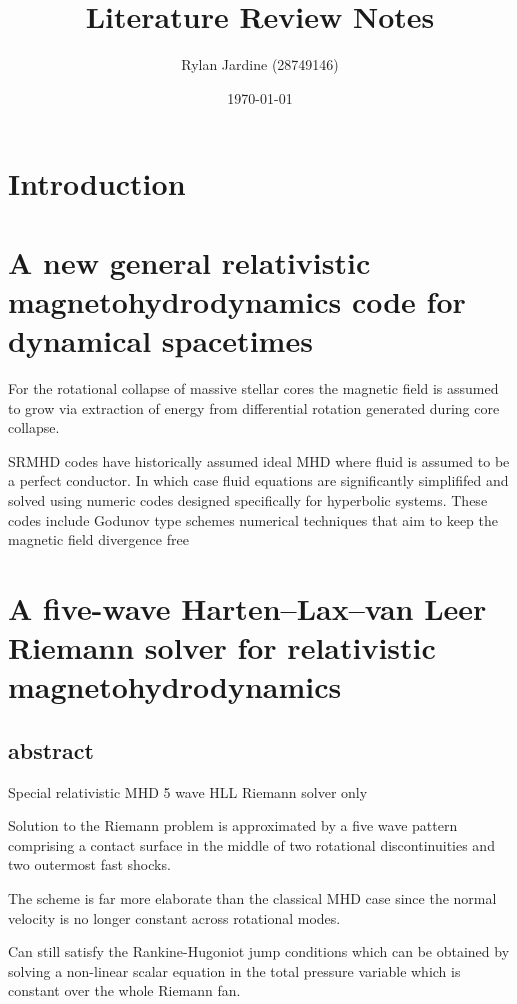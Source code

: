 \documentclass{article}
\title{\textbf{Literature Review Notes}}
\author{Rylan Jardine (28749146)}
\date{\today}
\begin{document}
\maketitle
\section{Introduction}



\section{A new general relativistic magnetohydrodynamics code for dynamical spacetimes}

\cite{newmhd}

For the rotational collapse of massive stellar cores the magnetic field is assumed to grow via extraction of energy from differential rotation generated during core collapse. 

SRMHD codes have historically assumed ideal MHD where fluid is assumed to be a perfect conductor. In which case fluid equations are significantly simplififed and solved using numeric codes designed specifically for hyperbolic systems. These codes include Godunov type schemes numerical techniques that aim to keep the magnetic field divergence free 

\section{A five-wave Harten--Lax--van Leer Riemann solver for relativistic magnetohydrodynamics}

 \cite{5waverel}
 
 \subsection{abstract}

Special relativistic MHD 5 wave HLL Riemann solver only

Solution to the Riemann problem is approximated by a five wave pattern comprising a contact surface in the middle of two rotational discontinuities and two outermost fast shocks. 

The scheme is far more elaborate than the classical MHD case since the normal velocity is no longer constant across rotational modes. 

Can still satisfy the Rankine-Hugoniot jump conditions which can be obtained by solving a non-linear scalar equation in the total pressure variable which is constant over the whole Riemann fan.
\end{document}
